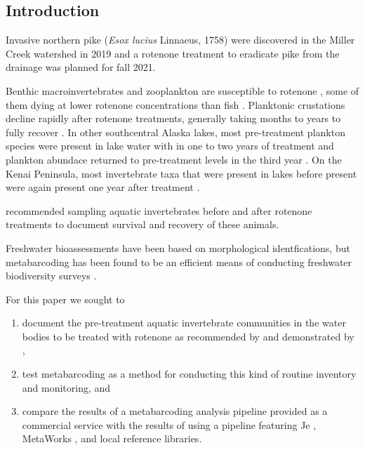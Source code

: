 \begin{multicols}{2}

\section{Introduction}

Invasive northern pike (\textit{Esox lucius} Linnaeus, 1758) were discovered in the Miller Creek watershed in 2019 \citep{KNWR2021} and a rotenone treatment to eradicate pike from the drainage was planned for fall 2021.

Benthic macroinvertebrates and zooplankton are susceptible to rotenone \citep{Finlaysonetal2018}, some of them dying at lower rotenone concentrations than fish \citep{Rach1988}. Planktonic crustations decline rapidly after rotenone treatments, generally taking months to years to fully recover \citep{Kiseretal1963, Anderson1970}. In other southcentral Alaska lakes, most pre-treatment plankton species were present in lake water with in one to two years of treatment and plankton abundace returned to pre-treatment levels in the third year \citep{Chlupach1977}. On the Kenai Peninsula, most invertebrate taxa that were present in lakes before present were again present one year after treatment \citep{Massengill2014, Massengill2017}. 

\citet{Finlaysonetal2018} recommended sampling aquatic invertebrates before and after rotenone treatments to document survival and recovery of these animals.

Freshwater bioassessments have been based on morphological identfications, but metabarcoding has been found to be an efficient means of conducting freshwater biodiversity surveys \citep{Turunenetal2021}.

For this paper we sought to

\begin{enumerate}
\item document the pre-treatment aquatic invertebrate communities in the water bodies to be treated with rotenone as recommended by \citet{Finlaysonetal2018} and demonstrated by \citep{Massengill2014, Massengill2017},
\item test metabarcoding as a method for conducting this kind of routine inventory and monitoring, and
\item compare the results of a metabarcoding analysis pipeline provided as a commercial service with the results of using a pipeline featuring Je \citep{Girardotetal2016}, MetaWorks \citep{PorterHajibabaei2020}, and local reference libraries.
\end{enumerate}


\end{multicols}

